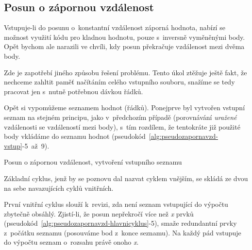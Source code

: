 \subsection{Posun o zápornou vzdálenost}
\label{zapornavzdalenost}

Vstupuje-li do posunu o~konstantní vzdálenost záporná hodnota, nabízí se možnost
využití kódu pro kladnou hodnotu, pouze s~inversně vyměněnými body. Opět bychom ale narazili
ve chvíli, kdy posun překračuje vzdálenost mezi dvěma body. 

Zde je zapotřebí jiného způsobu řešení problému. Tento úkol ztěžuje ještě fakt, že nechceme
zahltit paměť načítáním celého vstupního souboru, snažíme se tedy pracovat jen s~nutně
potřebnou dávkou řádků. 

Opět si vypomůžeme seznamem hodnot (řádků). Ponejprve byl vytvořen vstup\-ní seznam
na stejném principu, jako v~předchozím případě (porovnávání \textit{uražené} vzdálenosti se
vzdáleností mezi body), s~tím rozdílem, že tentokráte již použité body vkládáme do seznamu hodnot
(pseudokód~\ref{alg:pseudozapornavzd-vstup}-5~až~9).

\begin{algorithm}
\caption{Posun o zápornou vzdálenost, vytvoření vstupního seznamu}
\label{alg:pseudozapornavzd-vstup}
    \begin{algorithmic}[1]
    \ENDWHILE
    \end{algorithmic}
\end{algorithm}

Základní cyklus, jenž by se poznovu dal nazvat cyklem vnějším, se skládá ze dvou na sebe
navazujících cyklů vnitřních. 

První vnitřní cyklus slouží k~revizi, zda není seznam vstupující do výpočtu zbytečně obsáhlý.
Zjistí-li, že posun nepřekročí více než \textit{x} prvků
(pseudokód~\ref{alg:pseudozapornavzd-hlavnicyklus}-5), smaže redundantní prvky z~počátku seznamu (posouváme bod
z~konce seznamu). Na každý pád vstupuje do výpočtu seznam o~rozsahu právě onoho \textit{x}. 

